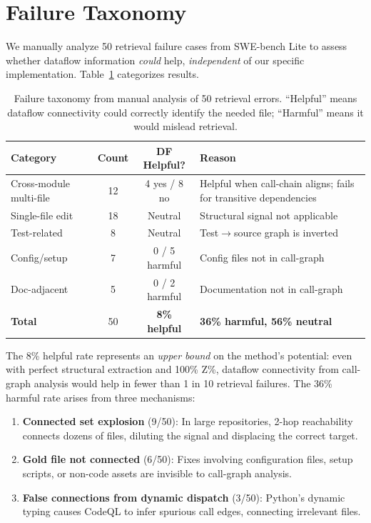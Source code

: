 \documentclass[11pt]{article}
\begin{document}
\section{Failure Taxonomy}
\label{sec:failure}

We manually analyze 50 retrieval failure cases from SWE-bench Lite to assess whether dataflow information \emph{could} help, \emph{independent} of our specific implementation. Table~\ref{tab:failure} categorizes results.

\begin{table}[t]
\centering
\caption{Failure taxonomy from manual analysis of 50 retrieval errors. ``Helpful'' means dataflow connectivity could correctly identify the needed file; ``Harmful'' means it would mislead retrieval.}
\label{tab:failure}
\begin{tabular}{lccp{5.5cm}}
\toprule
\textbf{Category} & \textbf{Count} & \textbf{DF Helpful?} & \textbf{Reason} \\
\midrule
Cross-module multi-file & 12 & 4 yes / 8 no & Helpful when call-chain aligns; fails for transitive dependencies \\
Single-file edit        & 18 & Neutral       & Structural signal not applicable \\
Test-related            & 8  & Neutral       & Test$\to$source graph is inverted \\
Config/setup            & 7  & 0 / 5 harmful & Config files not in call-graph \\
Doc-adjacent            & 5  & 0 / 2 harmful & Documentation not in call-graph \\
\midrule
\textbf{Total}          & 50 & \textbf{8\% helpful} & \textbf{36\% harmful, 56\% neutral} \\
\bottomrule
\end{tabular}
\end{table}

The 8\% helpful rate represents an \emph{upper bound} on the method's potential: even with perfect structural extraction and 100\% Z\%, dataflow connectivity from call-graph analysis would help in fewer than 1 in 10 retrieval failures. The 36\% harmful rate arises from three mechanisms:

\begin{enumerate}[leftmargin=*,itemsep=2pt]
    \item \textbf{Connected set explosion} (9/50): In large repositories, 2-hop reachability connects dozens of files, diluting the signal and displacing the correct target.
    \item \textbf{Gold file not connected} (6/50): Fixes involving configuration files, setup scripts, or non-code assets are invisible to call-graph analysis.
    \item \textbf{False connections from dynamic dispatch} (3/50): Python's dynamic typing causes CodeQL to infer spurious call edges, connecting irrelevant files.
\end{enumerate}
\end{document}

